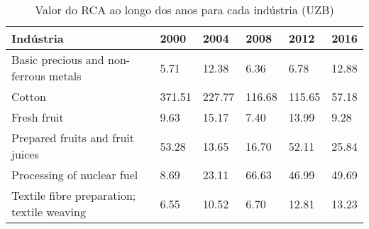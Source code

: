 \begin{table}
\centering
\caption{Valor do RCA ao longo dos anos para cada indústria (UZB)}
\label{tab:ex3-tempo-UZB}
\begin{tabular}{p{6cm}p{1.5cm}p{1.5cm}p{1.5cm}p{1.5cm}p{1.5cm}}
\toprule
                                 Indústria &   2000 &   2004 &   2008 &   2012 &  2016 \\
\midrule
     Basic precious and non-ferrous metals &   5.71 &  12.38 &   6.36 &   6.78 & 12.88 \\
                                    Cotton & 371.51 & 227.77 & 116.68 & 115.65 & 57.18 \\
                               Fresh fruit &   9.63 &  15.17 &   7.40 &  13.99 &  9.28 \\
          Prepared fruits and fruit juices &  53.28 &  13.65 &  16.70 &  52.11 & 25.84 \\
                Processing of nuclear fuel &   8.69 &  23.11 &  66.63 &  46.99 & 49.69 \\
Textile fibre preparation; textile weaving &   6.55 &  10.52 &   6.70 &  12.81 & 13.23 \\
\bottomrule
\end{tabular}
\end{table}
